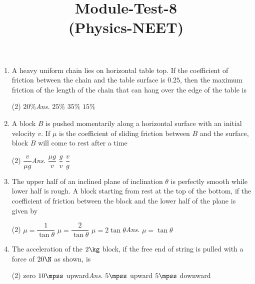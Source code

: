 \documentclass{article}
\title{Module-Test-8\\(Physics-NEET)}
\newcommand{\ans}{\textcolor{red!95}{\textit{\quad Ans.}}}
\begin{document}
\maketitle

\begin{enumerate}

\item A heavy uniform chain lies on horizontal table top. If the coefficient of friction between the chain and the table surface is $0.25$, then the maximum friction of the length of the chain that can hang over the edge of the table is
\begin{tasks}(2)
	\task $20\%$\ans
	\task $25\%$
	\task $35\%$
	\task $15\%$
\end{tasks}

\item A block $B$ is pushed momentarily along a horizontal surface with an initial velocity $v$. If $\mu$ is the coefficient of sliding friction between $B$ and the surface, block $B$ will come to rest after a time 
\begin{center}
\end{center}
\begin{tasks}(2)
	\task $\dfrac{v}{\mu g}$\ans
	\task $\dfrac{\mu g}{v}$
	\task $\dfrac{g}{v}$
	\task $\dfrac{v}{g}$
\end{tasks}

\item The upper half of an inclined plane of inclination $\theta$ is perfectly smooth while lower half is rough. A block starting from rest at the top of the bottom, if the coefficient of friction between the block and the lower half of the plane is given by
\begin{tasks}(2)
	\task $\mu = \dfrac{1}{\tan\theta}$
	\task $\mu = \dfrac{2}{\tan\theta}$
	\task $\mu = 2\tan\theta$\ans
	\task $\mu = \tan\theta$
\end{tasks}

\item The acceleration of the $2 \kg$ block, if the free end of string is
pulled with a force of $20 \N$ as shown, is
\begin{center}
\end{center}
\begin{tasks}(2)
	\task zero
	\task $10\mpss$ upward\ans
	\task $5\mpss$ upward
	\task $5\mpss$ downward
\end{tasks}


\end{enumerate}
\end{document}
